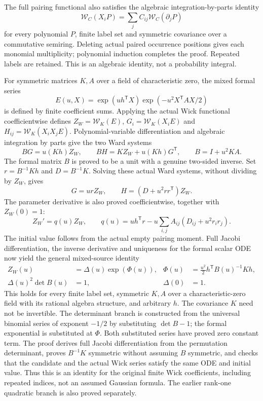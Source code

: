 \documentclass[11pt]{article}
\begin{document}
The full pairing functional also satisfies the algebraic integration-by-parts identity
\[
 \mathcal W_C(X_iP)=\sum_j C_{ij}\mathcal W_C(\partial_jP)
\]
for every polynomial $P$, finite label set and symmetric covariance over a commutative semiring. Deleting actual paired occurrence positions gives each monomial multiplicity; polynomial induction completes the proof. Repeated labels are retained. This is an algebraic identity, not a probability integral.

For symmetric matrices $K,A$ over a field of characteristic zero, the mixed formal series
\[
 E(u,X)=\exp(u h^{\mathsf T}X)\exp(-u^2X^{\mathsf T}AX/2)
\]
is defined by finite coefficient sums. Applying the actual Wick functional coefficientwise defines $Z_W=\mathcal W_K(E)$, $G_i=\mathcal W_K(X_iE)$ and $H_{ij}=\mathcal W_K(X_iX_jE)$. Polynomial-variable differentiation and algebraic integration by parts give the two Ward systems
\[
 B G=u(Kh)Z_W,\qquad B H=KZ_W+u(Kh)G^{\mathsf T},\qquad B=I+u^2KA.
\]
The formal matrix $B$ is proved to be a unit with a genuine two-sided inverse. Set $r=B^{-1}Kh$ and $D=B^{-1}K$. Solving these actual Ward systems, without dividing by $Z_W$, gives
\[
 G=urZ_W,\qquad H=(D+u^2rr^{\mathsf T})Z_W.
\]
The parameter derivative is also proved coefficientwise, together with $Z_W(0)=1$:
\[
 Z_W'=q(u)Z_W,\qquad
 q(u)=u h^{\mathsf T}r-u\sum_{i,j}A_{ij}(D_{ij}+u^2r_ir_j).
\]
The initial value follows from the actual empty pairing moment. Full Jacobi differentiation, the inverse derivative and uniqueness for the formal scalar ODE now yield the general mixed-source identity
\[
 \begin{aligned}
 Z_W(u)&=\Delta(u)\exp(\Phi(u)),&
 \Phi(u)&=\frac{u^2}{2}h^{\mathsf T}B(u)^{-1}Kh,\\
 \Delta(u)^2\det B(u)&=1,& \Delta(0)&=1.
 \end{aligned}
\]
This holds for every finite label set, symmetric $K,A$ over a characteristic-zero field with its rational algebra structure, and arbitrary $h$. The covariance $K$ need not be invertible. The determinant branch is constructed from the universal binomial series of exponent $-1/2$ by substituting $\det B-1$; the formal exponential is substituted at $\Phi$. Both substituted series have proved zero constant term. The proof derives full Jacobi differentiation from the permutation determinant, proves $B^{-1}K$ symmetric without assuming $B$ symmetric, and checks that the candidate and the actual Wick series satisfy the same ODE and initial value. Thus this is an identity for the original finite Wick coefficients, including repeated indices, not an assumed Gaussian formula. The earlier rank-one quadratic branch is also proved separately.
\end{document}
